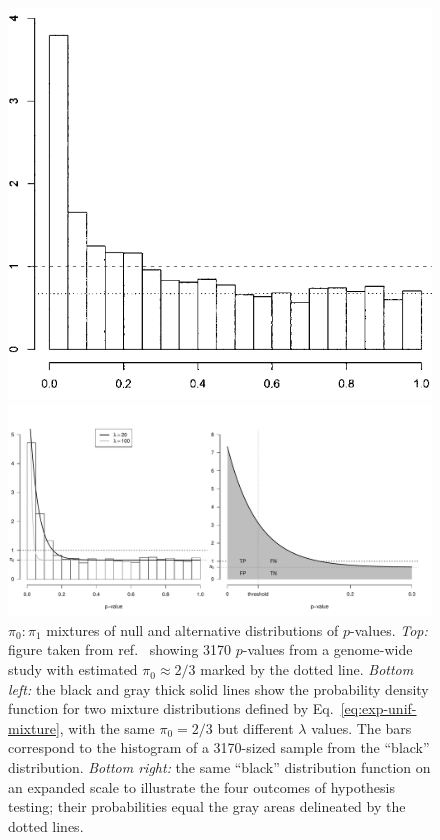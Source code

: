 \documentclass[letterpaper]{article}
\begin{document}
\begin{figure}[b]
\includegraphics[scale=1.04]{figures/storey-2003-fig1}

\includegraphics[scale=0.5]{figures/exp-unif-mixture-1.pdf}
\caption{\(\pi_0 : \pi_1\) mixtures of null and alternative distributions of
\(p\)-values.  \emph{Top:} figure taken from ref.~\cite{Storey:2003kx} showing
3170 \(p\)-values from a genome-wide study with estimated \(\pi_0 \approx 2/3\)
marked by the dotted line.  \emph{Bottom left:} the black and gray thick solid
lines show the probability density function for two mixture distributions
defined by Eq.~\ref{eq:exp-unif-mixture}, with the same \(\pi_0=2/3\) but
different \(\lambda\) values.  The bars correspond to the histogram of a
3170-sized sample from the ``black'' distribution.  \emph{Bottom right:} the
same ``black'' distribution function on an expanded scale to illustrate the four
outcomes of hypothesis testing; their probabilities equal the gray areas
delineated by the dotted lines. }
\label{fig:mixtures}
\end{figure}
\end{document}
